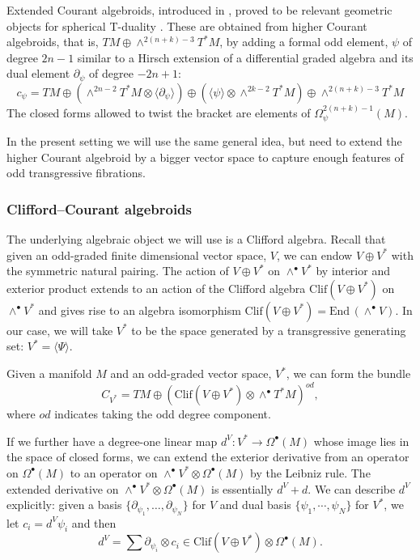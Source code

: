 \documentclass[12pt,twoside]{article}
\theoremstyle{plain}
\theoremstyle{definition}
\newcommand{\Clif}{\mathrm{Clif}}
\newcommand{\del}{\text{$\partial$}}
\newcommand{\tensor}{\otimes}
\newcommand{\End}{\mathrm{End}\,}
\newcommand{\IP}[1]{\langle #1 \rangle}
\numberwithin{equation}{section}
\begin{document}
Extended Courant algebroids, introduced in \cite{LUPERCIO201482}, proved to be relevant geometric objects for spherical T-duality \cite{CHU24}. These are obtained from higher Courant algebroids, that is, $TM \oplus \wedge^{2(n+k)-3}T^*M$, by adding a formal odd element, $\psi$ of degree $2n-1$ similar to a Hirsch extension of a differential graded algebra and its dual element $\del_\psi$ of degree $-2n+1$:
\begin{equation}\label{eq:extended higher}
c_\psi = TM \oplus (\wedge^{2n-2}T^*M\tensor\IP{\del_\psi}) \oplus (\IP{\psi}\tensor\wedge^{2k-2}T^*M)\oplus \wedge^{2(n+k)-3}T^*M 
\end{equation}
The closed forms allowed to twist the bracket are elements of $\Omega_\psi^{2(n+k)-1}(M)$.

In the present setting we will use the same general idea, but need to extend the higher Courant algebroid by a bigger vector space to capture enough features of odd transgressive fibrations. 

\subsubsection{Clifford--Courant algebroids}

The underlying algebraic object we will use is a Clifford algebra. Recall that given an odd-graded finite dimensional vector space, $V$, we can endow $V \oplus V^*$ with the symmetric natural pairing. The action of $V\oplus V^*$ on $\wedge^\bullet V^*$ by interior and exterior product extends to an action of the Clifford algebra $\Clif(V\oplus V^*)$ on $\wedge^\bullet V^*$ and gives rise to an algebra isomorphism $\Clif(V\oplus V^*) = \End(\wedge^\bullet V)$. In our case, we will take $V^*$ to be the space generated by a transgressive generating set: $V^* = \IP{\Psi}$.

Given a manifold $M$ and an odd-graded vector space, $V^*$, we can form the bundle
\[C_{V^*} = TM \oplus (\Clif(V\oplus V^*)\tensor \wedge^\bullet T^*M)^{od},\]
where ${od}$ indicates taking the odd degree component.

If we further have a degree-one linear map $d^V \colon V^* \to \Omega^\bullet(M)$ whose image lies in the space of closed forms, we can extend the exterior derivative from an operator on $\Omega^\bullet(M)$ to an operator on $\wedge^\bullet V^*\tensor \Omega^\bullet(M)$ by the Leibniz rule. The extended derivative on $\wedge^\bullet V^*\tensor \Omega^\bullet(M)$ is essentially $d^V + d$. We can describe $d^V$ explicitly: given a basis $\{\del_{\psi_1},\dots,\del_{\psi_N}\}$ for $V$ and dual basis $\{\psi_1,\cdots, \psi_N\}$ for $V^*$, we let $c_i = d^V \psi_i$ and then
\[d^V = \sum \del_{\psi_i} \tensor c_i  \in \Clif(V\oplus V^*)\tensor \Omega^\bullet(M).\]
\end{document}
